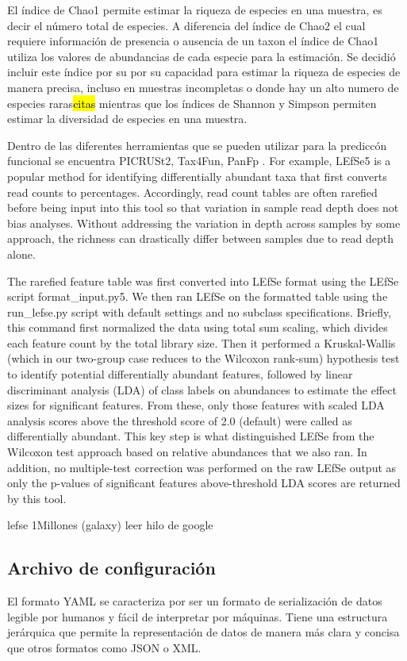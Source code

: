 El índice de Chao1 permite estimar la riqueza de especies en una muestra, es decir el número total de especies. A diferencia del índice de Chao2 el cual requiere información de presencia o ausencia de un taxon el índice de Chao1 utiliza los valores de abundancias de cada especie para la estimación.
Se decidió incluir este índice por su  por su capacidad para estimar la riqueza de especies de manera precisa, incluso en muestras incompletas o donde hay un alto numero de especies raras\hl{citas}
 mientras que los índices de Shannon y Simpson permiten estimar la diversidad de especies en una muestra.


Dentro de las diferentes herramientas que se pueden utilizar para la prediccón funcional se encuentra PICRUSt2, Tax4Fun,  PanFp
. 
For example, LEfSe5 is a popular method for identifying differentially abundant taxa that first converts read counts to percentages. Accordingly, read count tables are often rarefied before being input into this tool so that variation in sample read depth does not bias analyses. Without addressing the variation in depth across samples by some approach, the richness can drastically differ between samples due to read depth alone.


The rarefied feature table was first converted into LEfSe format using the LEfSe script format_input.py5. We then ran LEfSe on the formatted table using the run_lefse.py script with default settings and no subclass specifications. Briefly, this command first normalized the data using total sum scaling, which divides each feature count by the total library size. Then it performed a Kruskal-Wallis (which in our two-group case reduces to the Wilcoxon rank-sum) hypothesis test to identify potential differentially abundant features, followed by linear discriminant analysis (LDA) of class labels on abundances to estimate the effect sizes for significant features. From these, only those features with scaled LDA analysis scores above the threshold score of 2.0 (default) were called as differentially abundant. This key step is what distinguished LEfSe from the Wilcoxon test approach based on relative abundances that we also ran. In addition, no multiple-test correction was performed on the raw LEfSe output as only the p-values of significant features above-threshold LDA scores are returned by this tool.

lefse 1Millones (galaxy) 
leer hilo de google %
\subsection{Archivo de configuración} \label{subsection:conf_file}
El formato YAML se caracteriza por ser un formato de serialización de datos legible por humanos y fácil de interpretar por máquinas.
Tiene una estructura jerárquica que permite la representación de datos de manera más clara y concisa que otros formatos como JSON o XML.


